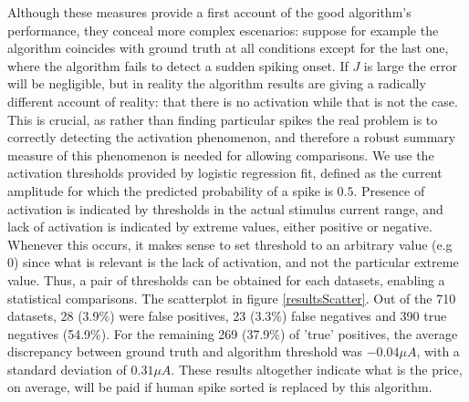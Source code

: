 \documentclass[12pt,letterpaper,fleqn]{article}
\begin{document}
Although these measures provide a first account of the good algorithm's performance, they conceal more complex escenarios: suppose for example the algorithm coincides with ground truth at all conditions except for the last one, where the algorithm fails to detect a sudden spiking onset. If $J$ is large the error will be negligible, but in reality the algorithm results are giving a radically different account of reality: that there is no activation while that is not the case. This is crucial, as rather than finding particular spikes the real problem is to correctly detecting the activation phenomenon, and therefore a robust summary measure of this phenomenon is needed for allowing comparisons. We use the activation thresholds provided by logistic regression fit, defined as the current amplitude for which the predicted probability of a spike is $0.5$.  Presence of activation  is indicated by thresholds in the actual stimulus current range, and lack of activation is indicated by extreme values, either positive or negative. Whenever this occurs, it makes sense to set threshold to an arbitrary value (e.g 0) since what is relevant is the lack of activation, and not the particular extreme value. Thus, a pair of thresholds can be obtained for each datasets, enabling a statistical comparisons. The scatterplot in figure \ref{resultsScatter}. Out of the 710 datasets, 28 (3.9\%) were false positives, 23 (3.3\%) false negatives and 390 true negatives (54.9\%). For the remaining 269 (37.9\%) of 'true' positives, the average discrepancy between ground truth and algorithm threshold was $-0.04 \mu A$, with a standard deviation of $0.31 \mu A$. These results altogether indicate what is the price, on average, will be paid if human spike sorted is replaced by this algorithm. 
\\ 
\end{document}

